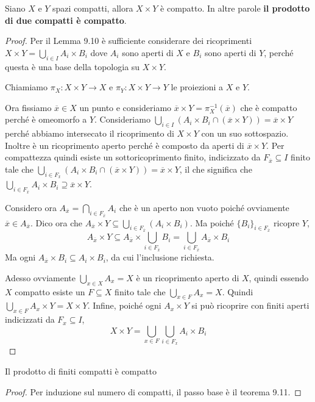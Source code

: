 \begin{theorem}
    Siano \(X\) e \(Y\) spazi compatti, allora \(X \times Y\) è compatto. In
    altre parole \textbf{il prodotto di due compatti è compatto}.
\end{theorem}
\begin{proof}
    Per il Lemma 9.10 è sufficiente considerare dei ricoprimenti \(X \times Y =
    \bigcup_{i \in  I} A_{i} \times B_{i}\) dove \(A_{i}\) sono aperti di \(X\)
    e \(B_{i}\) sono aperti di \(Y\), perché questa è una base della topologia
    su \(X \times Y\).

    Chiamiamo \(\pi_X: X \times  Y \to  X\) e \(\pi_Y: X \times Y \to  Y\) le
    proiezioni a \(X\) e \(Y\).

    Ora fissiamo \(\overline{x} \in  X\) un punto e consideriamo \(\overline{x} \times Y =
    \pi_X^{-1}(\overline{x})\) che è compatto perché è omeomorfo a \(Y\).
    Consideriamo \(\bigcup_{i \in  I} \left( A_{i} \times B_{i} \cap
    (\overline{x}\times Y) \right) = \overline{x} \times Y\) perché abbiamo
    intersecato il ricoprimento di \(X \times Y\) con un suo sottospazio.
    Inoltre è un ricoprimento aperto perché è composto da aperti di
    \(\overline{x} \times Y\). Per compattezza quindi esiste un
    sottoricoprimento finito, indicizzato da \(F_{\overline{x}} \subseteq I \) finito tale che
    \(\bigcup_{i \in F_{\overline{x}}} \left( A_{i} \times B_{i} \cap
    (\overline{x} \times Y) \right) = \overline{x} \times Y\), il che significa
    che \(\bigcup_{i \in F_{\overline{x}}} A_{i} \times B_{i} \supseteq
    \overline{x} \times Y\).

    Considero ora \(A_{\overline{x}} = \bigcap_{i \in
    F_{\overline{x}}} A_i \) che è un aperto non vuoto poiché ovviamente
    \(\overline{x} \in A_{\overline{x}} \). Dico ora che \(A_{\overline{x}}
    \times Y \subseteq \bigcup_{i \in F_{\overline{x}}} (A_{i} \times B_{i}) \).
    Ma poiché \(\{B_{i}\}_{i \in F_{\overline{x}}} \) ricopre \(Y\),
    \[A_{\overline{x}} \times Y \subseteq A_{\overline{x}} \times \bigcup_{i \in
        F_{\overline{x}}} B_{i} = \bigcup_{i \in F_{\overline{x}}}
    A_{\overline{x}} \times B_{i} \] Ma ogni \(A_{\overline{x}} \times B_{i}
    \subseteq A_{i} \times B_{i} \), da cui l'inclusione richiesta.

    Adesso ovviamente \(\bigcup_{x \in X} A_x = X \) è un ricoprimento aperto di
    \(X\), quindi essendo \(X\) compatto esiste un \(F \subseteq X \) finito
    tale che \(\bigcup_{x \in F}A_x = X \). Quindi \(\bigcup_{x \in F} A_x
    \times Y = X \times Y\). Infine, poiché ogni \(A_x \times Y\) si può
    ricoprire con finiti aperti indicizzati da \(F_x \subseteq I \),
    \[
        X \times Y = \bigcup_{x \in F} \bigcup_{i \in F_x} A_{i} \times B_{i}
    \]
\end{proof}
\begin{corollary}
    Il prodotto di finiti compatti è compatto
\end{corollary}
\begin{proof}
    Per induzione sul numero di compatti, il passo base è il teorema 9.11.
\end{proof}

